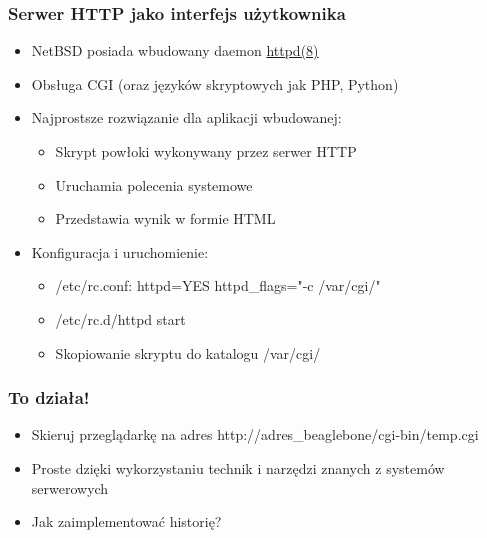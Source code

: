 \documentclass[dvipsnames,table]{beamer}
\begin{document}

\begin{frame}[fragile]
\frametitle{Serwer HTTP jako interfejs użytkownika}
\begin{itemize}
	\item NetBSD posiada wbudowany daemon \href{http://netbsd.gw.com/cgi-bin/man-cgi?httpd++NetBSD-current}{httpd(8)}
	\item Obsługa CGI (oraz języków skryptowych jak PHP, Python)	
	\item Najprostsze rozwiązanie dla aplikacji wbudowanej:
	\begin{itemize}
		\item Skrypt powłoki wykonywany przez serwer HTTP
		\item Uruchamia polecenia systemowe
		\item Przedstawia wynik w formie HTML
	\end{itemize}
	\item Konfiguracja i uruchomienie:
	\begin{itemize}
		\item /etc/rc.conf: httpd=YES httpd\_flags="-c /var/cgi/"
		\item /etc/rc.d/httpd start
		\item Skopiowanie skryptu do katalogu /var/cgi/
	\end{itemize}

\end{itemize}
\lstCGI
\end{frame}

\begin{frame}
\frametitle{To działa!}
\begin{itemize}
	\item Skieruj przeglądarkę na adres http://adres\_beaglebone/cgi-bin/temp.cgi
	\item Proste dzięki wykorzystaniu technik i narzędzi znanych z systemów serwerowych
	\item Jak zaimplementować historię?
\end{itemize}
\end{frame}
\end{document}
